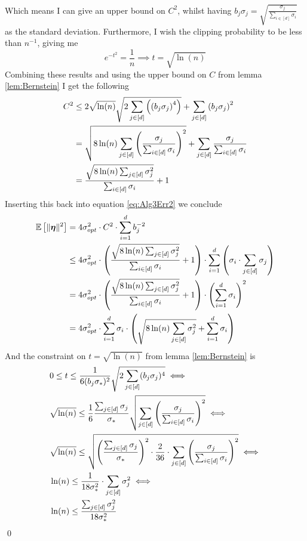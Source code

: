 \documentclass[a4paper,12pt]{article}
\renewenvironment{proof}{{\textit{Proof} \\}}{\qed}
\begin{document}
\begin{proof}
Which means I can give an upper bound on $C^2$, whilst having
$b_j \sigma_j = \sqrt{\frac{\sigma_j}{\sum_{i \in [d]} \sigma_i}}$ 
as the standard deviation.
Furthermore, I wish the clipping probability to be less than $n^{-1}$, giving me
\[
    e^{-t^2} = \frac{1}{n} \implies t = \sqrt{\ln (n)}
\]
Combining these results and using the upper bound on $C$ from lemma \ref{lem:Bernstein} I get the following
\begin{align*}
    C^2 &\le 2 \sqrt{\ln(n)} \sqrt{2\sum_{j \in [d]}  \left (\left (b_j\sigma_j\right)^4\right)} + 
    \sum_{j \in [d]} \left (b_j\sigma_j\right)^2 \\
    &=\sqrt{8 \ln(n) \sum_{j \in [d]} \left (\frac{\sigma_j}{\sum_{i \in [d]} \sigma_i}\right)^2} + 
    \sum_{j \in [d]} \frac{\sigma_j}{\sum_{i \in [d]} \sigma_i} \\
    &=\frac{\sqrt{8 \ln(n) \sum_{j \in [d]} \sigma_j^2}}{\sum_{i \in [d]} \sigma_i}
    + 1
\end{align*}
Inserting this back into equation \eqref{eq:Alg3Err2} we conclude
\begin{align*}
    \mathbb{E} \left [ \| \bm{\eta} \|^2 \right] &= 4\sigma_{opt}^2 \cdot 
    C^2 \cdot \sum_{i=1}^d b_j^{-2} \\
    &\le 4\sigma_{opt}^2 \cdot 
    \left (\frac{\sqrt{8 \ln(n) \sum_{j \in [d]} \sigma_j^2}}{\sum_{i \in [d]} \sigma_i}
    + 1\right) \cdot \sum_{i=1}^d \left (\sigma_i \cdot \sum_{j \in [d]} \sigma_j\right) \\
    &= 4\sigma_{opt}^2 \cdot 
    \left (\frac{\sqrt{8 \ln(n) \sum_{j \in [d]} \sigma_j^2}}{\sum_{i \in [d]} \sigma_i}
    + 1\right) \cdot \left (\sum_{i=1}^d \sigma_i\right)^2 \\
    &= 4\sigma_{opt}^2 \cdot \sum_{i=1}^d \sigma_i \cdot 
    \left (\sqrt{8 \ln(n) \sum_{j \in [d]} \sigma_j^2}
    + \sum_{i=1}^d \sigma_i\right)
\end{align*}
And the constraint on $t = \sqrt{\ln (n)}$ from lemma \ref{lem:Bernstein} is
\begin{align*}
    &0 \le t \le \frac{1}{6 (b_j\sigma_*)^2} \sqrt{2\sum_{j \in [d]} (b_j\sigma_j)^4} \iff \\
    &\sqrt{\ln (n)} \le \frac{1}{6} \frac{\sum_{j \in [d]} \sigma_j}{\sigma_*} \sqrt{\sum_{j \in [d]} \left (\frac{\sigma_j}{\sum_{i \in [d]} \sigma_i}\right)^2} \iff \\
    &\sqrt{\ln (n)} \le \sqrt{\left (\frac{\sum_{j \in [d]} \sigma_j}{\sigma_*}\right)^2 \cdot \frac{2}{36} \cdot \sum_{j \in [d]} \left (\frac{\sigma_j}{\sum_{i \in [d]} \sigma_i}\right)^2} \iff \\
    &\ln (n) \le \frac{1}{18\sigma_*^2} \cdot \sum_{j \in [d]} \sigma_j^2 \iff \\
    &\ln (n) \le \frac{\sum_{j \in [d]} \sigma_j^2}{18 \sigma_*^2}
\end{align*}
\end{proof}
\end{document}
